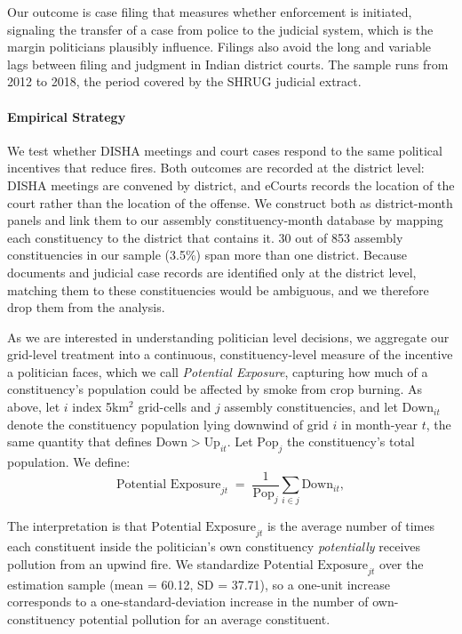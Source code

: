 \documentclass[12pt]{article}
\begin{document}
Our outcome is case filing that measures whether enforcement is initiated, signaling the transfer of a case from police to the judicial system, which is the margin politicians plausibly influence. Filings also avoid the long and variable lags between filing and judgment in Indian district courts. The sample runs from 2012 to 2018, the period covered by the SHRUG judicial extract.


\paragraph{Empirical Strategy}
We test whether DISHA meetings and court cases respond to the same political incentives that reduce fires. Both outcomes are recorded at the district level: DISHA meetings are convened by district, and eCourts records the location of the court rather than the location of the offense. We construct both as district-month panels and link them to our assembly constituency-month database by mapping each constituency to the district that contains it. 30 out of 853 assembly constituencies in our sample (3.5\%) span more than one district. Because documents and judicial case records are identified only at the district level, matching them to these constituencies would be ambiguous, and we therefore drop them from the analysis.

As we are interested in understanding politician level decisions, we aggregate our grid-level treatment into a continuous, constituency-level measure of the incentive a politician faces, which we call \emph{Potential Exposure}, capturing how much of a constituency's population could be affected by smoke from crop burning. As above, let $i$ index 5km$^2$ grid-cells and $j$ assembly constituencies, and let $\text{Down}_{it}$ denote the constituency population lying downwind of grid $i$ in month-year $t$, the same quantity that defines $\text{Down} > \text{Up}_{it}$. Let $\text{Pop}_j$ the constituency's total population. We define:
\begin{equation}
\text{Potential Exposure}_{jt} \;=\; \frac{1}{\text{Pop}_j} \sum_{i \in j} \text{Down}_{it},
\label{eq:potexposure}
\end{equation}

The interpretation is that $\text{Potential Exposure}_{jt}$ is the average number of times each constituent inside the politician's own constituency \emph{potentially} receives pollution from an upwind fire. We standardize $\text{Potential Exposure}_{jt}$ over the estimation sample (mean = 60.12, SD = 37.71), so a one-unit increase corresponds to a one-standard-deviation increase in the number of own-constituency potential pollution for an average constituent. 
\end{document}
